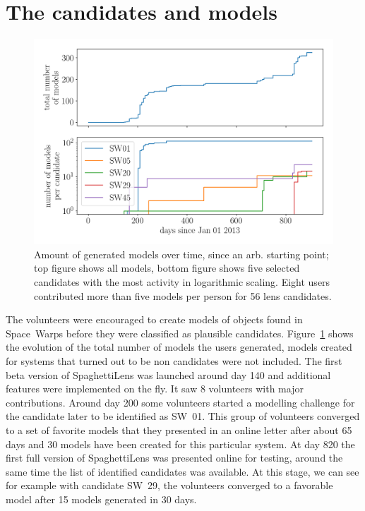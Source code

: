 \section{The candidates and models}

\begin{figure}
  \includegraphics[width=\linewidth]{img/timelapse3}
  \caption{ Amount of generated models over time, since an arb. starting point; top figure shows all models, bottom figure shows five selected candidates with the most activity in logarithmic scaling. Eight users contributed more than five models per person for 56 lens candidates. }
  \label{fig:time}
\end{figure}

The volunteers were encouraged to create models of objects found in Space~Warps before they were classified as plausible candidates.
Figure~\ref{fig:time} shows the evolution of the total number of models the users generated, models created for systems that turned out to be non candidates were not included.
The first beta version of SpaghettiLens was launched around day 140 and additional features were implemented on the fly.
It saw 8 volunteers with major contributions.
Around day 200 some volunteers started a modelling challenge for the candidate later to be identified as SW~01.
This group of volunteers converged to a set of favorite models that they presented in an online letter after about 65 days and 30 models have been created for this particular system.
At day 820 the first full version of SpaghettiLens was presented online for testing, around the same time the list of identified candidates was available.
At this stage, we can see for example with candidate SW~29, the volunteers converged to a favorable model after 15 models generated in 30 days.


